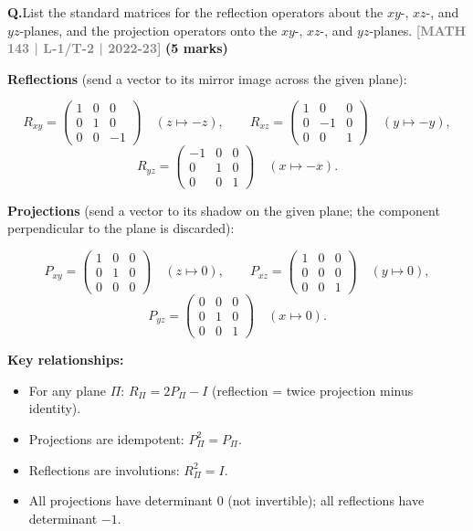 \documentclass[12pt,a3paper]{article}
\newcommand{\yr}[1]{\hfill\textcolor{gray}{\small\textbf{[#1]}}}
\newcommand{\mk}[1]{\textcolor{orange!70!black}{\small\textbf{(#1 marks)}}}
\newcounter{qnum}
\newcommand{\Q}[1]{%
  \needspace{4\baselineskip}
  \refstepcounter{qnum}
  \vspace{6pt}
  \noindent\textbf{Q\theqnum.}\enspace #1\par
}
\begin{document}
\Q{List the standard matrices for the reflection operators about the $xy$-, $xz$-, and $yz$-planes, and the projection operators onto the $xy$-, $xz$-, and $yz$-planes.
\yr{MATH 143 | L-1/T-2 | 2022-23} \mk{5}}


\begin{tcolorbox}[enhanced,breakable,
  colback=cF!4,colframe=cF,boxrule=0.8pt,arc=5pt,
  title={\textbf{Answer --- Standard Matrices: Reflections \& Projections in $\mathbb{R}^3$}},
  fonttitle=\bfseries\color{white},colbacktitle=cF]

\textbf{Reflections} (send a vector to its mirror image across the given plane):

\[
R_{xy}=\begin{pmatrix}1&0&0\\0&1&0\\0&0&-1\end{pmatrix}\quad(z\mapsto-z),
\qquad
R_{xz}=\begin{pmatrix}1&0&0\\0&-1&0\\0&0&1\end{pmatrix}\quad(y\mapsto-y),
\]
\[
R_{yz}=\begin{pmatrix}-1&0&0\\0&1&0\\0&0&1\end{pmatrix}\quad(x\mapsto-x).
\]

\textbf{Projections} (send a vector to its shadow on the given plane; the component perpendicular to the plane is discarded):

\[
P_{xy}=\begin{pmatrix}1&0&0\\0&1&0\\0&0&0\end{pmatrix}\quad(z\mapsto0),
\qquad
P_{xz}=\begin{pmatrix}1&0&0\\0&0&0\\0&0&1\end{pmatrix}\quad(y\mapsto0),
\]
\[
P_{yz}=\begin{pmatrix}0&0&0\\0&1&0\\0&0&1\end{pmatrix}\quad(x\mapsto0).
\]

\textbf{Key relationships:}
\begin{itemize}[itemsep=2pt]
  \item For any plane $\Pi$: $R_\Pi = 2P_\Pi - I$ (reflection = twice projection minus identity).
  \item Projections are idempotent: $P_\Pi^2=P_\Pi$.
  \item Reflections are involutions: $R_\Pi^2=I$.
  \item All projections have determinant 0 (not invertible); all reflections have determinant $-1$.
\end{itemize}

\end{tcolorbox}
\end{document}
